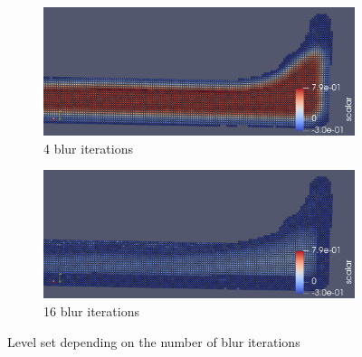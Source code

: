 \begin{figure}[H]
        \begin{subfigure}[b]{0.5\textwidth}
               \includegraphics[width=\textwidth]{figures/LevelSetBlurIterations4.png}
				\caption{4 blur iterations}
               \label{fig:ls_bi_original}
        \end{subfigure}
        \begin{subfigure}[b]{0.5\textwidth}
               \includegraphics[width=\textwidth]{figures/LevelSetBlurIterations16.png}
				\caption{16 blur iterations}

				\label{fig:ls_bi_16iteration}
        \end{subfigure}
       \caption{Level set depending on the number of blur iterations}
       \label{fig:bi_levelset}
\end{figure}

